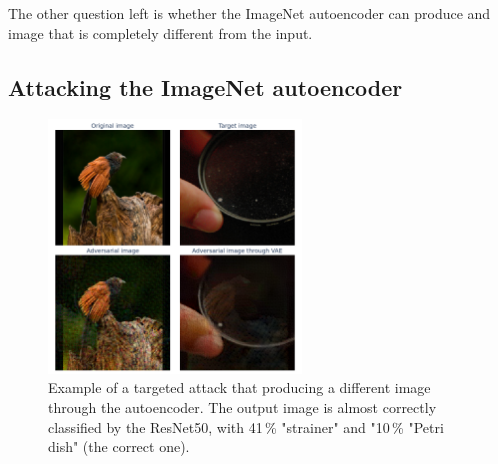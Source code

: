 \documentclass[]{scrarticle}
\begin{document}
The other question left is whether the ImageNet autoencoder can produce
and image that is completely different from the input.

\subsection{Attacking the ImageNet autoencoder}

\begin{figure}[h]
  \centering
  \includegraphics[width=0.6\textwidth]{images/ae_targeted_attack_example.png}
  \caption{
    Example of a targeted attack that producing a different image
    through the autoencoder.
    The output image is almost correctly classified by the ResNet50,
    with 41\,\% "strainer" and "10\,\% "Petri dish" (the correct one).
  }
  \label{fig:ae_targeted_attack_example}
\end{figure}
\end{document}
